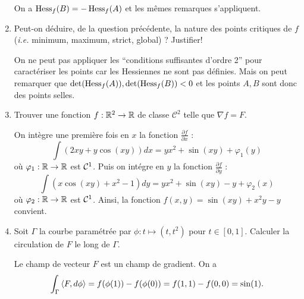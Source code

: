 \documentclass{article}
\begin{document}
\begin{enumerate}
		On a $\operatorname{Hess}_f (B) = - \operatorname{Hess}_f (A)$ et les mêmes remarques s'appliquent.


	\item Peut-on déduire, de la question précédente, la nature des points critiques de $f$ (\textit{i.e.} minimum, maximum, strict, global) ? Justifier!

	\medskip

On ne peut pas appliquer les ``conditions suffisantes d'ordre 2'' pour caractériser les points car les Hessiennes ne sont pas définies. Mais on peut remarquer que $\det(\operatorname{Hess}_f(A)), \det(\operatorname{Hess}_f(B)) < 0$ et les points  $A,B$  sont donc des points selles.

	\medskip

	\item Trouver une fonction $f:\mathbb{R}^2 \to \mathbb{R}$ de classe $\mathcal C^2$ telle que $\nabla f = F$.
	
	\medskip

		On intègre une première fois en $x$ la fonction $\frac{\partial f}{\partial x}$ : 
\[
	\int (2xy+y\cos(xy)) dx =  y x^2 +\sin(xy) + \varphi_1(y)
\]
où $\varphi_1:\mathbb{R}\to\mathbb{R} $ est $\mathcal{C}^1$. Puis on intégre en $y$ la fonction $\frac{\partial f}{\partial y} $ :
\[
\int (x\cos(xy) +x^2-1)  dy =  y x^2 +\sin(xy) -y + \varphi_2(x)
\]
où $\varphi_2:\mathbb{R}\to\mathbb{R} $ est $\mathcal{C}^1$.  Ainsi, la fonction  $f(x,y) = \sin(xy) + x^2 y - y$ convient.
	
	\medskip

	\item Soit $\Gamma$ la courbe paramétrée par $\phi : t \mapsto (t,t^2)$ pour $t \in [0,1]$. Calculer la circulation de $F$  le long de $\Gamma$.

		
	\medskip
Le champ de vecteur $F$ est un champ de gradient. On a 
		\[\int_{\Gamma} \left\langle F,d\phi\right\rangle = f(\phi(1)) - f(\phi(0)) = f(1,1) - f(0,0)= \sin(1).\]
\end{enumerate}

\bigskip 
\end{document}
